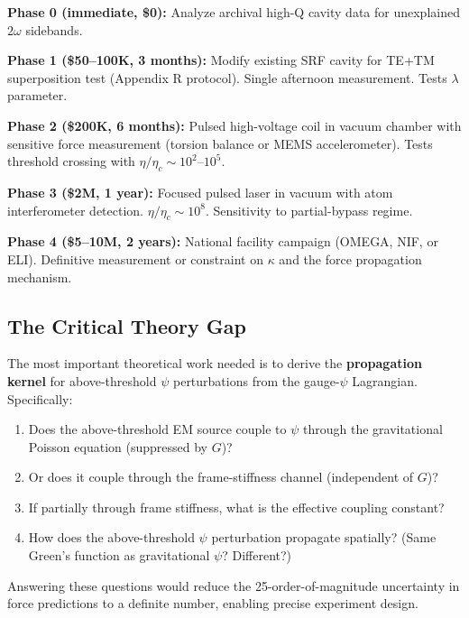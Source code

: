 \documentclass[12pt,a4paper]{article}
\begin{document}
\begin{tcolorbox}[colback=green!5!white, colframe=green!50!black,
  title=Phased Experimental Roadmap]

\textbf{Phase 0 (immediate, \$0):}
Analyze archival high-Q cavity data for unexplained $2\omega$ sidebands.

\textbf{Phase 1 (\$50--100K, 3 months):}
Modify existing SRF cavity for TE+TM superposition test (Appendix R protocol).
Single afternoon measurement.  Tests $\lambda$ parameter.

\textbf{Phase 2 (\$200K, 6 months):}
Pulsed high-voltage coil in vacuum chamber with sensitive force measurement
(torsion balance or MEMS accelerometer).  Tests threshold crossing with
$\eta/\eta_c \sim 10^2$--$10^5$.

\textbf{Phase 3 (\$2M, 1 year):}
Focused pulsed laser in vacuum with atom interferometer detection.
$\eta/\eta_c \sim 10^8$.  Sensitivity to partial-bypass regime.

\textbf{Phase 4 (\$5--10M, 2 years):}
National facility campaign (OMEGA, NIF, or ELI).  Definitive measurement
or constraint on $\kappa$ and the force propagation mechanism.
\end{tcolorbox}

\subsection{The Critical Theory Gap}

The most important theoretical work needed is to derive the \textbf{propagation
kernel} for above-threshold $\psi$ perturbations from the gauge-$\psi$ Lagrangian.
Specifically:
\begin{enumerate}
\item Does the above-threshold EM source couple to $\psi$ through the gravitational
  Poisson equation (suppressed by $G$)?
\item Or does it couple through the frame-stiffness channel (independent of $G$)?
\item If partially through frame stiffness, what is the effective coupling constant?
\item How does the above-threshold $\psi$ perturbation propagate spatially?
  (Same Green's function as gravitational $\psi$?  Different?)
\end{enumerate}

Answering these questions would reduce the 25-order-of-magnitude uncertainty
in force predictions to a definite number, enabling precise experiment design.
\end{document}
